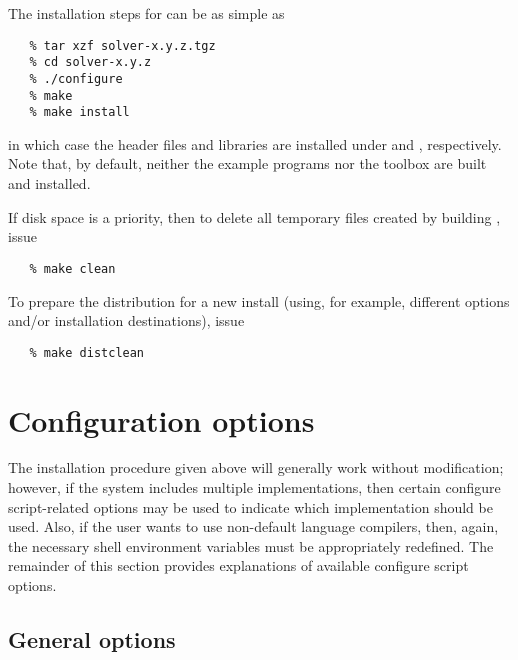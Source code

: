 \vspace{0.2in}
{\noindent}The installation steps for {\sundials} can be as simple as 
\begin{verbatim}
   % tar xzf solver-x.y.z.tgz
   % cd solver-x.y.z
   % ./configure
   % make
   % make install
\end{verbatim}
in which case the {\sundials} header files and libraries are installed under 
and , respectively. Note that, by default, neither the example programs nor the 
{\sundialsTB} toolbox are built and installed.

If disk space is a priority, then to delete all temporary files created by building {\sundials}, issue
\begin{verbatim}
   % make clean
\end{verbatim}

To prepare the {\sundials} distribution for a new install (using, for example, different options and/or
installation destinations), issue
\begin{verbatim}
   % make distclean
\end{verbatim}


\section{Configuration options}\label{ss:configuration_options}

The installation procedure given above will generally work without modification;
however, if the system includes multiple {\mpi} implementations, then certain
configure script-related options may be used to indicate which {\mpi}
implementation should be used. Also, if the user wants to use non-default
language compilers, then, again, the necessary shell environment variables must
be appropriately redefined.
The remainder of this section provides explanations of available configure script
options.


\subsection*{General options}


